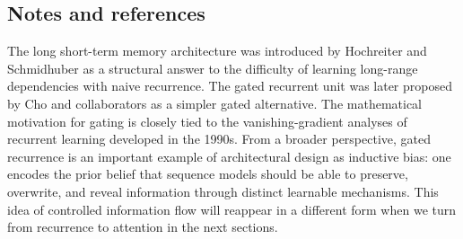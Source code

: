 \subsection*{Notes and references}

The long short-term memory architecture was introduced by Hochreiter and Schmidhuber as a structural answer to the difficulty of learning long-range dependencies with naive recurrence.
The gated recurrent unit was later proposed by Cho and collaborators as a simpler gated alternative.
The mathematical motivation for gating is closely tied to the vanishing-gradient analyses of recurrent learning developed in the 1990s.
From a broader perspective, gated recurrence is an important example of architectural design as inductive bias: one encodes the prior belief that sequence models should be able to preserve, overwrite, and reveal information through distinct learnable mechanisms.
This idea of controlled information flow will reappear in a different form when we turn from recurrence to attention in the next sections.
